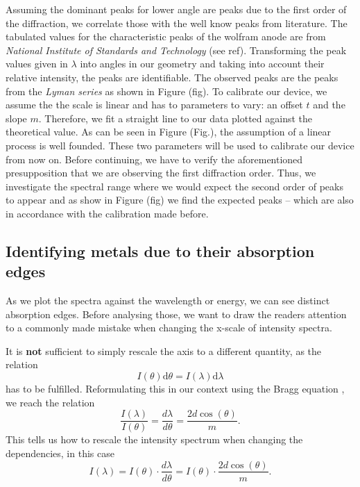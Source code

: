 Assuming the dominant peaks for lower angle are peaks due to the first order of the diffraction, we correlate those with the well know peaks from literature. The tabulated values for the characteristic peaks of the wolfram anode are from \textit{National Institute of Standards and Technology} (see ref).
Transforming the peak values given in $\lambda$ into angles in our geometry and taking into account their relative intensity, the peaks are identifiable.
The observed peaks are the peaks from the \textit{Lyman series} as shown in Figure (fig). To calibrate our device, we assume the the scale is linear and has to parameters to vary: an offset $t$ and the slope $m$. Therefore, we 
fit a straight line to our data plotted against the theoretical value. As can be seen in Figure (Fig.), the assumption of a linear process is well founded. 
These two parameters will be used to calibrate our device from now on. Before continuing, we have to verify the aforementioned presupposition that we are observing the first diffraction order.
Thus, we investigate the spectral range where we would expect the second order of peaks to appear and as show in Figure (fig) we find the expected peaks -- which are also in accordance with the calibration made before.

\subsection{Identifying metals due to their absorption edges}

As we plot the spectra against the wavelength or energy, we can see distinct absorption edges. Before analysing those, 
we want to draw the readers attention to a commonly made mistake when changing the x-scale of intensity spectra.

It is \textbf{not} sufficient to simply rescale the axis to a different quantity, as the relation
\begin{equation*}
    I(\theta) \mathrm{d}\theta = I(\lambda) \mathrm{d}\lambda
\end{equation*}
has to be fulfilled. Reformulating this in our context using the Bragg equation , we reach the relation 
\begin{equation}
    \frac{I(\lambda)}{I(\theta)} = \frac{d \lambda}{d \theta} = \frac{2 d \cos(\theta)}{m}.
\end{equation}
This tells us how to rescale the intensity spectrum when changing the dependencies, in this case 
\begin{equation}
    I(\lambda) = I(\theta) \cdot  \frac{d \lambda}{d \theta} = I(\theta) \cdot \frac{2 d \cos(\theta)}{m} .
\end{equation}


